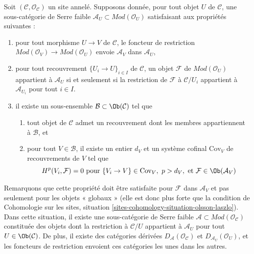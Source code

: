 \medskip\noindent
Soit $(\mathcal{C}, \mathcal{O}_\mathcal{C})$ un site annelé.
Supposons donnée, pour tout objet $U$ de $\mathcal{C}$,
une sous-catégorie de Serre faible $\mathcal{A}_U \subset \textit{Mod}(\mathcal{O}_U)$
satisfaisant aux propriétés suivantes :
\begin{enumerate}
\item
\label{item-restriction}
pour tout morphisme $U \to V$ de $\mathcal{C}$, le foncteur de restriction
$\textit{Mod}(\mathcal{O}_V) \to \textit{Mod}(\mathcal{O}_U)$
envoie $\mathcal{A}_V$ dans $\mathcal{A}_U$,
\item
\label{item-local}
pour tout recouvrement $\{U_i \to U\}_{i \in I}$ de $\mathcal{C}$,
un objet $\mathcal{F}$ de $\textit{Mod}(\mathcal{O}_U)$
appartient à $\mathcal{A}_U$ si et seulement si la restriction de
$\mathcal{F}$ à $\mathcal{C}/U_i$ appartient à $\mathcal{A}_{U_i}$
pour tout $i \in I$.
\item
\label{item-bounded-dimension}
il existe un sous-ensemble $\mathcal{B} \subset \Ob(\mathcal{C})$
tel que
\begin{enumerate}
\item tout objet de $\mathcal{C}$ admet un recouvrement dont les membres
appartiennent à $\mathcal{B}$, et
\item pour tout $V \in \mathcal{B}$, il existe un entier $d_V$
et un système cofinal $\text{Cov}_V$ de recouvrements de $V$ tel
que
$$
H^p(V_i, \mathcal{F}) = 0 \text{ pour }
\{V_i \to V\} \in \text{Cov}_V,\ p > d_V, \text{ et }
\mathcal{F} \in \Ob(\mathcal{A}_V)
$$
\end{enumerate}
\end{enumerate}
Remarquons que cette propriété doit être satisfaite pour $\mathcal{F}$ dans
$\mathcal{A}_V$ et pas seulement pour les objets « globaux »
(elle est donc plus forte que la condition de
Cohomologie sur les sites, situation \ref{sites-cohomology-situation-olsson-laszlo}).
Dans cette situation, il existe une sous-catégorie de Serre faible
$\mathcal{A} \subset \textit{Mod}(\mathcal{O}_\mathcal{C})$
constituée des objets dont la restriction à $\mathcal{C}/U$
appartient à $\mathcal{A}_U$ pour tout $U \in \Ob(\mathcal{C})$.
De plus, il existe des catégories dérivées
$D_\mathcal{A}(\mathcal{O}_\mathcal{C})$ et
$D_{\mathcal{A}_U}(\mathcal{O}_U)$, et les foncteurs de restriction
envoient ces catégories les unes dans les autres.

